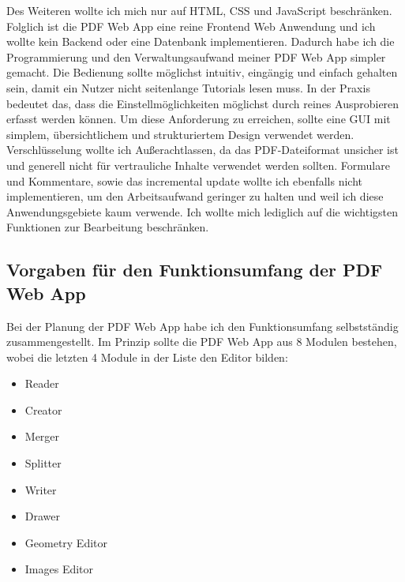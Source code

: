 Des Weiteren wollte ich mich nur auf HTML, CSS und JavaScript beschränken. Folglich ist die PDF Web App eine reine Frontend Web Anwendung und ich wollte kein Backend oder eine Datenbank implementieren. Dadurch habe ich die Programmierung und den Verwaltungsaufwand meiner PDF Web App simpler gemacht. Die Bedienung sollte möglichst intuitiv, eingängig und einfach gehalten sein, damit ein Nutzer nicht seitenlange Tutorials lesen muss. In der Praxis bedeutet das, dass die Einstellmöglichkeiten möglichst durch reines Ausprobieren erfasst werden können. Um diese Anforderung zu erreichen, sollte eine GUI mit simplem, übersichtlichem und strukturiertem Design verwendet werden. Verschlüsselung wollte ich Außerachtlassen, da das PDF-Dateiformat unsicher ist und generell nicht für vertrauliche Inhalte verwendet werden sollten. Formulare und Kommentare, sowie das incremental update wollte ich ebenfalls nicht implementieren, um den Arbeitsaufwand geringer zu halten und weil ich diese Anwendungsgebiete kaum verwende. Ich wollte mich lediglich auf die wichtigsten Funktionen zur Bearbeitung beschränken.


\subsection{Vorgaben für den Funktionsumfang der PDF Web App}
Bei der Planung der PDF Web App habe ich den Funktionsumfang selbstständig zusammengestellt. Im Prinzip sollte die PDF Web App aus 8 Modulen bestehen, wobei die letzten 4 Module in der Liste den Editor bilden:

\begin{itemize}
	\item Reader
	\item Creator
	\item Merger
	\item Splitter
	\item Writer
	\item Drawer
	\item Geometry Editor
	\item Images Editor
\end{itemize}

